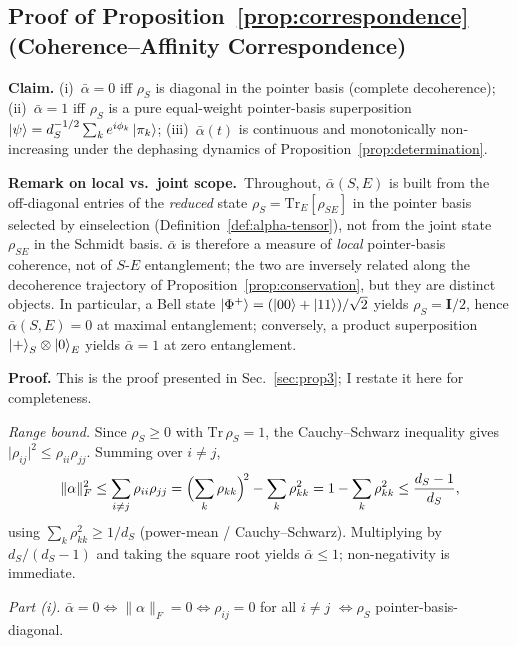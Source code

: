 \subsection{Proof of Proposition~\ref{prop:correspondence} (Coherence--Affinity Correspondence)}

\textbf{Claim.} (i)~$\bar\alpha = 0$ iff $\rho_S$ is diagonal in the
pointer basis (complete decoherence);
(ii)~$\bar\alpha = 1$ iff $\rho_S$ is a pure equal-weight pointer-basis
superposition $\ket{\psi} = d_S^{-1/2}\sum_k e^{i\phi_k}\ket{\pi_k}$;
(iii)~$\bar\alpha(t)$ is continuous and monotonically non-increasing
under the dephasing dynamics of Proposition~\ref{prop:determination}.

\textbf{Remark on local vs.\ joint scope.}~Throughout, $\bar\alpha(S,E)$
is built from the off-diagonal entries of the \emph{reduced} state
$\rho_S = \mathrm{Tr}_E[\rho_{SE}]$ in the pointer basis selected by
einselection (Definition~\ref{def:alpha-tensor}), not from the joint
state $\rho_{SE}$ in the Schmidt basis.
$\bar\alpha$ is therefore a measure of \emph{local} pointer-basis
coherence, not of $S$-$E$ entanglement; the two are inversely related
along the decoherence trajectory of
Proposition~\ref{prop:conservation}, but they are distinct objects.
In particular, a Bell state $\ket{\Phi^+} = (\ket{00}+\ket{11})/\sqrt{2}$
yields $\rho_S = \mathbf{I}/2$, hence $\bar\alpha(S,E) = 0$ at maximal
entanglement; conversely, a product superposition
$\ket{+}_S\otimes\ket{0}_E$ yields $\bar\alpha = 1$ at zero
entanglement.

\textbf{Proof.}
This is the proof presented in
Sec.~\ref{sec:prop3}; I restate it here for completeness.

\textit{Range bound.}
Since $\rho_S\geq 0$ with $\mathrm{Tr}\,\rho_S = 1$, the
Cauchy--Schwarz inequality gives
$\lvert\rho_{ij}\rvert^2 \leq \rho_{ii}\rho_{jj}$.
Summing over $i\neq j$,
\begin{equation*}
  \lVert\alpha\rVert_F^2
    \leq \sum_{i\neq j}\rho_{ii}\rho_{jj}
    = \Bigl(\sum_k\rho_{kk}\Bigr)^{\!2} - \sum_k\rho_{kk}^2
    = 1 - \sum_k\rho_{kk}^2
    \leq \frac{d_S - 1}{d_S},
\end{equation*}
using $\sum_k\rho_{kk}^2 \geq 1/d_S$ (power-mean / Cauchy--Schwarz).
Multiplying by $d_S/(d_S-1)$ and taking the square root yields
$\bar\alpha\leq 1$; non-negativity is immediate.

\textit{Part (i).}
$\bar\alpha = 0\Leftrightarrow\lVert\alpha\rVert_F = 0
 \Leftrightarrow \rho_{ij}=0$ for all $i\neq j$
 $\Leftrightarrow\rho_S$ pointer-basis-diagonal.

